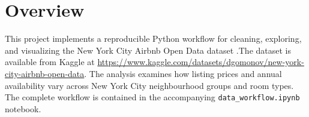 \section{Overview}

This project implements a reproducible Python workflow for cleaning,
exploring, and visualizing the New York City Airbnb Open Data dataset
\parencite{gomonov2019}.The dataset is available
from Kaggle at
\url{https://www.kaggle.com/datasets/dgomonov/new-york-city-airbnb-open-data}. The analysis examines how listing prices and
annual availability vary across New York City neighbourhood groups and room
types. The complete workflow is contained in the accompanying
\texttt{data\_workflow.ipynb} notebook.